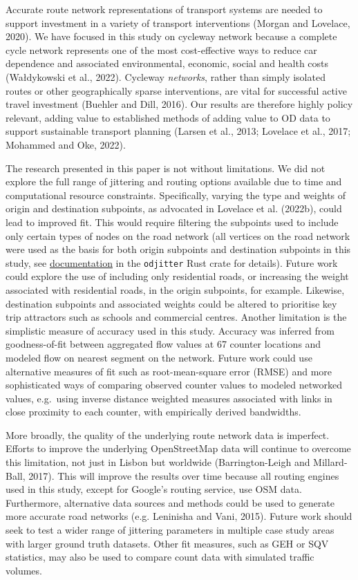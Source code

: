 \documentclass{isprs} %
\begin{document}
Accurate route network representations of transport systems are needed to support investment in a variety of transport interventions (Morgan and Lovelace, 2020).
We have focused in this study on cycleway network because a complete cycle network represents one of the most cost-effective ways to reduce car dependence and associated environmental, economic, social and health costs (Wałdykowski et al., 2022).
Cycleway \emph{networks}, rather than simply isolated routes or other geographically sparse interventions, are vital for successful active travel investment (Buehler and Dill, 2016).
Our results are therefore highly policy relevant, adding value to established methods of adding value to OD data to support sustainable transport planning (Larsen et al., 2013; Lovelace et al., 2017; Mohammed and Oke, 2022).

The research presented in this paper is not without limitations.
We did not explore the full range of jittering and routing options available due to time and computational resource constraints.
Specifically, varying the type and weights of origin and destination subpoints, as advocated in Lovelace et al. (2022b), could lead to improved fit.
This would require filtering the subpoints used to include only certain types of nodes on the road network (all vertices on the road network were used as the basis for both origin subpoints and destination subpoints in this study, see \href{https://github.com/dabreegster/odjitter}{documentation} in the \texttt{odjitter} Rust crate for details).
Future work could explore the use of including only residential roads, or increasing the weight associated with residential roads, in the origin subpoints, for example.
Likewise, destination subpoints and associated weights could be altered to prioritise key trip attractors such as schools and commercial centres.
Another limitation is the simplistic measure of accuracy used in this study.
Accuracy was inferred from goodness-of-fit between aggregated flow values at 67 counter locations and modeled flow on nearest segment on the network.
Future work could use alternative measures of fit such as root-mean-square error (RMSE) and more sophisticated ways of comparing observed counter values to modeled networked values, e.g.~using inverse distance weighted measures associated with links in close proximity to each counter, with empirically derived bandwidths.

More broadly, the quality of the underlying route network data is imperfect.
Efforts to improve the underlying OpenStreetMap data will continue to overcome this limitation, not just in Lisbon but worldwide (Barrington-Leigh and Millard-Ball, 2017).
This will improve the results over time because all routing engines used in this study, except for Google's routing service, use OSM data.
Furthermore, alternative data sources and methods could be used to generate more accurate road networks (e.g. Leninisha and Vani, 2015).
Future work should seek to test a wider range of jittering parameters in multiple case study areas with larger ground truth datasets.
Other fit measures, such as GEH or SQV statistics, may also be used to compare count data with simulated traffic volumes.
\end{document}
